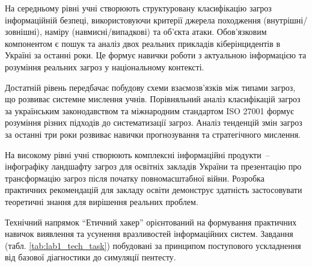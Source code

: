 На середньому рівні учні створюють структуровану класифікацію загроз інформаційній безпеці, використовуючи критерії джерела походження (внутрішні/зовнішні), наміру (навмисні/випадкові) та об'єкта атаки. Обов'язковим компонентом є пошук та аналіз двох реальних прикладів кіберінцидентів в Україні за останні роки. Це формує навички роботи з актуальною інформацією та розуміння реальних загроз у національному контексті.

Достатній рівень передбачає побудову схеми взаємозв'язків між типами загроз, що розвиває системне мислення учнів. Порівняльний аналіз класифікацій загроз за українським законодавством та міжнародним стандартом ISO 27001 формує розуміння різних підходів до систематизації загроз. Аналіз тенденцій змін загроз за останні три роки розвиває навички прогнозування та стратегічного мислення.

На високому рівні учні створюють комплексні інформаційні продукти~-- інфографіку ландшафту загроз для освітніх закладів України та презентацію про трансформацію загроз після початку повномасштабної війни. Розробка практичних рекомендацій для закладу освіти демонструє здатність застосовувати теоретичні знання для вирішення реальних проблем.


Технічний напрямок ``Етичний хакер'' орієнтований на формування практичних навичок виявлення та усунення вразливостей інформаційних систем. Завдання (табл. \ref{tab:lab1_tech_task}) побудовані за принципом поступового ускладнення від базової діагностики до симуляції пентесту.

